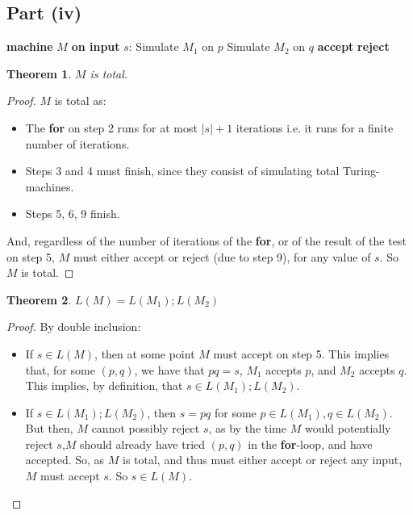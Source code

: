 \documentclass[a4paper,12pt]{scrartcl}
\newcommand{\Machine}[2]{\State \textbf{machine} #1 \textbf{on input} #2:}
\newcommand{\Reject}{\State \textbf{reject}}
\newcommand{\Accept}{\State \textbf{accept}}
\newtheorem{theorem}{Theorem}
\begin{document}
\subsection{Part (iv)}
\begin{algorithmic}[1]
    \Machine{$M$}{$s$}
        \State Simulate $M_1$ on $p$
        \State Simulate $M_2$ on $q$
            \Accept
        \EndIf
    \EndFor
    \Reject
\end{algorithmic}

\begin{theorem}
    $M$ is total.
\end{theorem}
\begin{proof}
    $M$ is total as:
    \begin{itemize}
        \item The \textbf{for} on step 2 runs for at most $|s| + 1$ iterations i.e. it runs for a finite number of iterations.
        \item Steps 3 and 4 must finish, since they consist of simulating total Turing-machines.
        \item Steps 5, 6, 9 finish.
    \end{itemize}
    And, regardless of the number of iterations of the \textbf{for}, or of the result of the test on step 5, $M$ must either accept or reject (due to step 9), for any value of $s$. So $M$ is total.
\end{proof}

\begin{theorem}
    $L(M) = L(M_1);L(M_2)$
\end{theorem}
\begin{proof}
    By double inclusion:
    \begin{itemize}
        \item If $s \in L(M)$, then at some point $M$ must accept on step 5. This implies that, for some $(p, q)$, we have that $pq = s$, $M_1$ accepts $p$, and $M_2$ accepts $q$. This implies, by definition, that $s \in L(M_1);L(M_2)$.
        \item If $s \in L(M_1);L(M_2)$, then $s = pq$ for some $p \in L(M_1), q \in L(M_2)$. But then, $M$ cannot possibly reject $s$, as by the time $M$ would potentially reject $s$,$M$ should already have tried $(p, q)$ in the \textbf{for}-loop, and have accepted. So, as $M$ is total, and thus must either accept or reject any input, $M$ must accept $s$. So $s \in L(M)$.
    \end{itemize}
\end{proof}
\end{document}
